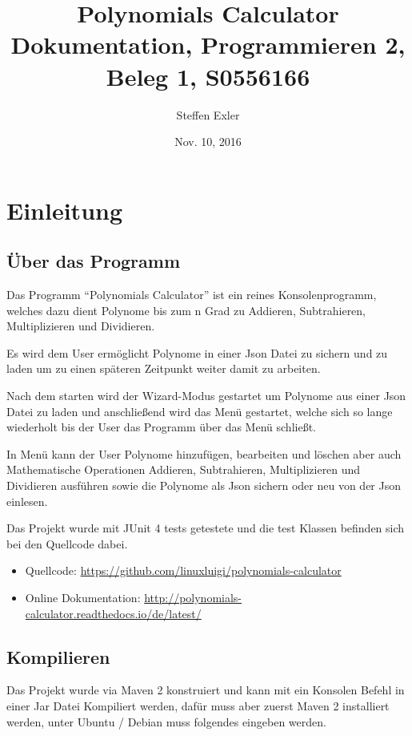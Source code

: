 \documentclass[letterpaper,10pt,ngerman]{sphinxmanual}
\title{Polynomials Calculator Dokumentation, Programmieren 2, Beleg 1, S0556166}
\date{Nov. 10, 2016}
\author{Steffen Exler}
\begin{document}
\maketitle
\tableofcontents
{}\label{index::doc}



\chapter{Einleitung}
\label{index:polynomials-calculator-doc}\label{index:einleitung}

\section{Über das Programm}
\label{intro:uber-das-programm}\label{intro::doc}
Das Programm ``Polynomials Calculator'' ist ein reines Konsolenprogramm, welches dazu dient Polynome
bis zum n Grad zu Addieren, Subtrahieren, Multiplizieren und Dividieren.

Es wird dem User ermöglicht Polynome in einer Json Datei zu sichern und zu laden um zu einen späteren
Zeitpunkt weiter damit zu arbeiten.

Nach dem starten wird der Wizard-Modus gestartet um Polynome aus einer Json Datei zu laden und anschließend
wird das Menü gestartet, welche sich so lange wiederholt bis der User das Programm über das Menü schließt.

In Menü kann der User Polynome hinzufügen, bearbeiten und löschen aber auch Mathematische Operationen
Addieren, Subtrahieren, Multiplizieren und Dividieren ausführen sowie die Polynome als Json sichern
oder neu von der Json einlesen.

Das Projekt wurde mit JUnit 4 tests getestete und die test Klassen befinden sich bei den Quellcode dabei.
\begin{itemize}
\item {} 
Quellcode: \url{https://github.com/linuxluigi/polynomials-calculator}

\item {} 
Online Dokumentation: \url{http://polynomials-calculator.readthedocs.io/de/latest/}

\end{itemize}

\noindent{}


\section{Kompilieren}
\label{intro:kompilieren}
Das Projekt wurde via Maven 2 konstruiert und kann mit ein Konsolen Befehl in einer Jar Datei Kompiliert werden, dafür
muss aber zuerst Maven 2 installiert werden, unter Ubuntu / Debian muss folgendes eingeben werden.
\end{document}
